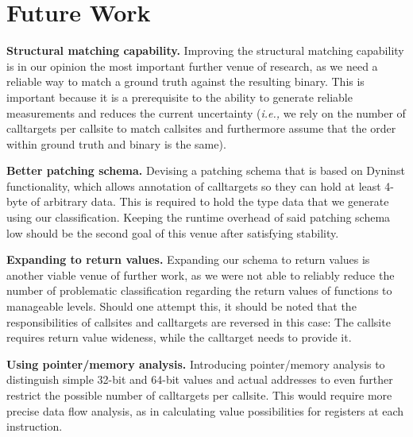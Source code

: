 \section{Future Work}
\label{chapter:Future_Work}
\textbf{Structural matching capability.} 
Improving the structural matching capability is in our opinion the most 
important further venue of research, as we need a reliable way to 
match a ground truth against the resulting binary. This is important 
because it is a prerequisite to the ability to generate reliable 
measurements and reduces the current uncertainty (\textit{i.e.,} we rely on the 
number of calltargets per callsite to match callsites and furthermore
assume that the order within ground truth and binary is the same).

\textbf{Better patching schema.} 
Devising a patching schema
that is based on Dyninst functionality, 
which allows annotation of calltargets so they can hold at least 
4-byte of arbitrary data. This is required to hold the type data that
we generate using our classification. Keeping the runtime overhead
of said patching schema low should be the second goal of this venue 
after satisfying stability.

\textbf{Expanding to return values.} 
Expanding our schema to return values
is another viable venue of further work, as we were not able to 
reliably reduce the number of problematic classification regarding 
the return values of functions to 
manageable levels. Should one attempt this, it should be noted that the
responsibilities of callsites and calltargets are reversed in this 
case: The callsite requires return value wideness, while the calltarget
needs to provide it.

\textbf{Using pointer/memory analysis.} 
Introducing pointer/memory analysis
to distinguish simple 32-bit and 64-bit values and actual addresses to even further restrict the 
possible number of calltargets per callsite. This would require more 
precise data flow analysis, as in calculating value possibilities for 
registers at each instruction.
